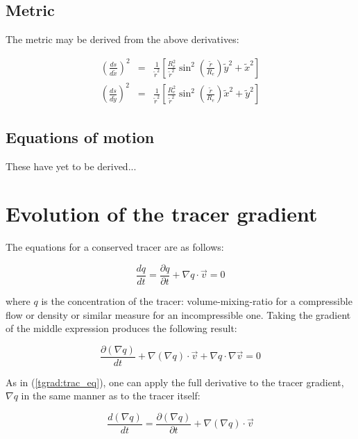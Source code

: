 \documentclass[12pt]{report}
\begin{document}
\begin{flushleft}
\subsection{Metric}

The metric may be derived from the above derivatives:

\begin{eqnarray}
\left (\frac{ds}{d \tilde x} \right )^2 & = & \frac{1}{\tilde r^2} \left [
	\frac{R_e^2}{\tilde r^2} \sin^2 \left (\frac{\tilde r}{R_e} \right ) 
	\tilde y^2 + \tilde x^2 \right ] \\
\left (\frac{ds}{d \tilde y} \right )^2 & = & \frac{1}{\tilde r^2} \left [
	\frac{R_e^2}{\tilde r^2} \sin^2 \left (\frac{\tilde r}{R_e} \right )
	\tilde x^2 + \tilde y^2 \right ]
\end{eqnarray}

\subsection{Equations of motion}

These have yet to be derived...

\section{Evolution of the tracer gradient}

The equations for a conserved tracer are as follows:

\begin{equation}
\frac{dq}{dt} = \frac{\partial q}{\partial t} + \nabla q \cdot \vec v = 0
\label{tgrad:trac_eq}
\end{equation}

where $q$ is the concentration of the tracer: volume-mixing-ratio for a
compressible flow or density or similar measure for an incompressible one.
Taking the gradient of the middle expression produces the following result:

\begin{equation}
\frac{\partial (\nabla q)}{dt} + \nabla (\nabla q) \cdot \vec v + \nabla q \cdot \nabla \vec v = 0
\label{tgrad:grad_trac}
\end{equation}

As in (\ref{tgrad:trac_eq}), one can apply the full derivative to the tracer gradient, $\nabla q$ in the
same manner as to the tracer itself:

\begin{equation}
\frac{d (\nabla q)}{dt} = \frac{\partial (\nabla q)}{\partial t} + \nabla (\nabla q) \cdot \vec v
\label{tgrad:tgrad_full}
\end{equation}


\end{flushleft}
\end{document}
